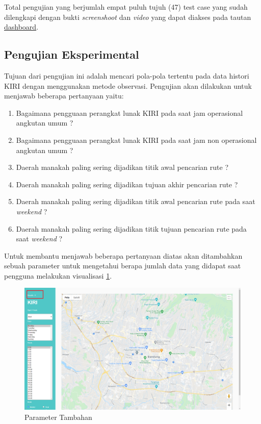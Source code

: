 Total pengujian yang berjumlah empat puluh tujuh (47) test case yang sudah dilengkapi dengan bukti \textit{screenshoot} dan \textit{video} yang dapat diakses pada tautan \href{https://dashboard.cypress.io/projects/cgtb3m/runs/1/overview}{dashboard}.

\subsection{Pengujian Eksperimental}
\label{subsec: pengujian}
Tujuan dari pengujian ini adalah mencari pola-pola tertentu pada data histori KIRI dengan menggunakan metode observasi. Pengujian akan dilakukan untuk menjawab beberapa pertanyaan yaitu:
\begin{enumerate}
    \item Bagaimana pengguaan perangkat lunak KIRI pada saat jam operasional angkutan umum ?
    \item Bagaimana pengguaan perangkat lunak KIRI pada saat jam non operasional angkutan umum ?
    \item  Daerah manakah  paling sering dijadikan titik awal pencarian rute ?
    \item  Daerah manakah  paling sering dijadikan tujuan akhir pencarian rute ?
    \item Daerah manakah  paling sering dijadikan titik awal pencarian rute pada saat \textit{weekend} ?
    \item Daerah manakah  paling sering dijadikan titik tujuan pencarian rute pada saat \textit{weekend} ?
\end{enumerate}

\newpage Untuk membantu menjawab beberapa pertanyaan diatas akan ditambahkan sebuah parameter untuk mengetahui berapa jumlah data yang didapat saat pengguna melakukan visualisasi \ref{fig:testingState}.
   
    \begin{figure}[H]
	\centering  
	\includegraphics[scale=0.3]{Gambar/pengujian/result_helper.png}  
	\caption[parameter tambahan]{Parameter Tambahan} 
	\label{fig:testingState}
	\end{figure}
	

